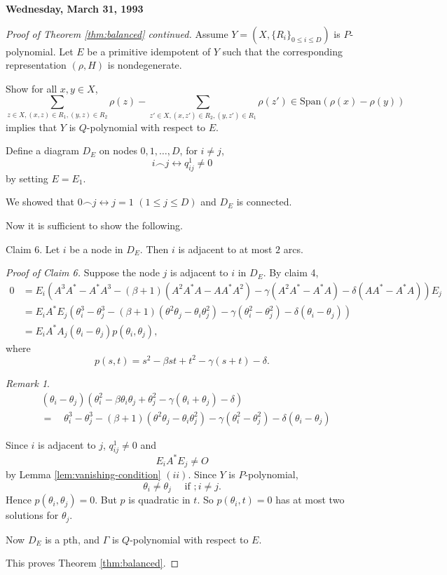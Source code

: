 \documentclass[
]{book}
\theoremstyle{definition}
\theoremstyle{definition}
\theoremstyle{definition}
\theoremstyle{definition}
\theoremstyle{remark}
\newtheorem*{remark}{Remark}
\begin{document}
\textbf{Wednesday, March 31, 1993}

\begin{proof}[Proof of Theorem \ref{thm:balanced} continued]
Assume \(Y = (X, \{R_i\}_{0\leq i\leq D})\) is \(P\)-polynomial.
Let \(E\) be a primitive idempotent of \(Y\) such that the corresponding representation \((\rho, H)\) is nondegenerate.

Show for all \(x, y\in X\),
\[\sum_{z\in X, (x,z)\in R_1, (y,z)\in R_2}\rho(z) - \sum_{z'\in X, (x,z')\in R_2, (y,z')\in R_1}\rho(z') \in \mathrm{Span}(\rho(x)-\rho(y))\]
implies that \(Y\) is \(Q\)-polynomial with respect to \(E\).

Define a diagram \(D_E\) on nodes \(0, 1, \ldots, D\), for \(i\neq j\),
\[i \frown j \leftrightarrow q^1_{ij}\neq 0\]
by setting \(E = E_1\).

We showed that \(0 \frown j \leftrightarrow j = 1\) \((1\leq j\leq D)\) and \(D_E\) is connected.

Now it is sufficient to show the following.

Claim 6. Let \(i\) be a node in \(D_E\). Then \(i\) is adjacent to at most \(2\) arcs.

\emph{Proof of Claim 6.}
Suppose the node \(j\) is adjacent to \(i\) in \(D_E\). By claim 4,
\begin{align}
0 & = E_i(A^3A^* - A^*A^3 - (\beta+1)(A^2A^*A-AA^*A^2) - \gamma(A^2A^*-A^*A) - \delta(AA^*-A^*A))E_j\\
& = E_iA^*E_j(\theta^3_i-\theta^3_j-(\beta+1)(\theta^2\theta_j - \theta_i\theta_j^2)-\gamma(\theta_i^2-\theta_j^2)-\delta(\theta_i-\theta_j))\\
& = E_iA^*A_j(\theta_i-\theta_j)p(\theta_i, \theta_j),
\end{align}
where
\[p(s,t) = s^2 - \beta st + t^2 - \gamma(s+t) - \delta.\]

\begin{remark}
\begin{align}
& (\theta_i-\theta_j)(\theta_i^2 - \beta \theta_i\theta_j + \theta_j^2 - \gamma(\theta_i + \theta_j) - \delta)\\
& = \quad \theta^3_i-\theta^3_j-(\beta+1)(\theta^2\theta_j - \theta_i\theta_j^2)-\gamma(\theta_i^2-\theta_j^2)-\delta(\theta_i-\theta_j)
\end{align}
\end{remark}

Since \(i\) is adjacent to \(j\), \(q^1_{ij}\neq 0\) and
\[E_iA^*E_j\neq O\]
by Lemma \ref{lem:vanishing-condition} \((ii)\).
Since \(Y\) is \(P\)-polynomial,
\[\theta_i \neq \theta_j \quad \text{ if }; i\neq j.\]
Hence \(p(\theta_i,\theta_j) = 0\). But \(p\) is quadratic in \(t\). So \(p(\theta_i,t) = 0\) has at most two solutions for \(\theta_j\).

Now \(D_E\) is a pth, and \(\Gamma\) is \(Q\)-polynomial with respect to \(E\).

This proves Theorem \ref{thm:balanced}.
\end{proof}
\end{document}
